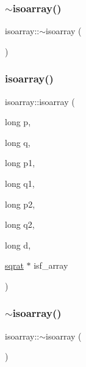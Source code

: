 \mbox{\label{classisoarray_ab1ff7ca3e0edb468608b42d2d2aad08b}} 
\subsubsection{\texorpdfstring{$\sim$isoarray()}{~isoarray()}\hspace{0.1cm}{\footnotesize\ttfamily [2/3]}}
{\footnotesize\ttfamily isoarray\+::$\sim$isoarray (\begin{DoxyParamCaption}{ }\end{DoxyParamCaption})}

\mbox{\label{classisoarray_a2255ec3a14431cdc95ea8d0b0150fde6}} 
\subsubsection{\texorpdfstring{isoarray()}{isoarray()}\hspace{0.1cm}{\footnotesize\ttfamily [3/3]}}
{\footnotesize\ttfamily isoarray\+::isoarray (\begin{DoxyParamCaption}\item[{long}]{p,  }\item[{long}]{q,  }\item[{long}]{p1,  }\item[{long}]{q1,  }\item[{long}]{p2,  }\item[{long}]{q2,  }\item[{long}]{d,  }\item[{\mbox{\hyperlink{classsqrat}{sqrat}} $\ast$}]{isf\+\_\+array }\end{DoxyParamCaption})}

\mbox{\label{classisoarray_ab1ff7ca3e0edb468608b42d2d2aad08b}} 
\subsubsection{\texorpdfstring{$\sim$isoarray()}{~isoarray()}\hspace{0.1cm}{\footnotesize\ttfamily [3/3]}}
{\footnotesize\ttfamily isoarray\+::$\sim$isoarray (\begin{DoxyParamCaption}{ }\end{DoxyParamCaption})}



